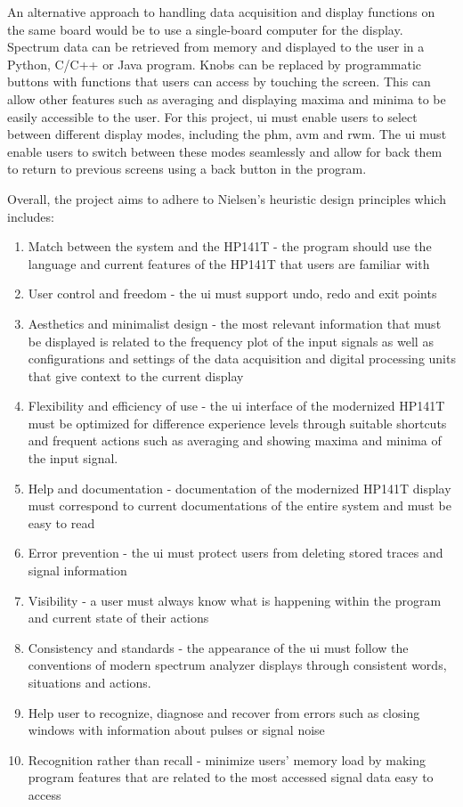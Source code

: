 \documentclass[class=report,11pt,crop=false]{standalone}
\begin{document}
	An alternative approach to handling data acquisition and display functions on the same board would be to use a single-board computer for the display. Spectrum data can be retrieved from memory and displayed to the user in a Python, C/C++ or Java program. Knobs can be replaced by programmatic buttons with functions that users can access by touching the screen. This can allow other features such as averaging and displaying maxima and minima to be easily accessible to the user. For this project, \acrshort{ui} must enable users to select between different display modes, including the \acrshort{phm}, \acrshort{avm} and \acrshort{rwm}. The \acrshort{ui} must enable users to switch between these modes seamlessly and allow for back them to return to previous screens using a back button in the program.
	
	Overall, the project aims to adhere to Nielsen's heuristic design principles which includes:
	\begin{enumerate}
		\item
		Match between the system and the HP141T -  the program should use the language and current features of the HP141T that users are familiar with
		\item 
		User control and freedom - the \acrshort{ui} must support undo, redo and exit points
		\item 
		Aesthetics and minimalist design - the most relevant information that must be displayed is related to the frequency plot of the input signals as well as configurations and settings of the data acquisition and digital processing units that give context to the current display
		\item 
		Flexibility and efficiency of use - the \acrshort{ui} interface of the modernized HP141T must be optimized for difference experience levels through suitable shortcuts and frequent actions such as averaging and showing maxima and minima of the input signal.
		\item 
		Help and documentation - documentation of the modernized HP141T display must correspond to current documentations of the entire system and must be easy to read
		\item 
		Error prevention - the \acrshort{ui} must protect users from deleting stored traces and signal information
		\item 
		Visibility - a user must always know what is happening within the program and current state of their actions
		\item 
		Consistency and standards - the appearance of the \acrshort{ui} must follow the conventions of modern spectrum analyzer displays through consistent words, situations and actions.
		\item 
		Help user to recognize, diagnose and recover from errors such as closing windows with information about pulses or signal noise
		\item 
		Recognition rather than recall - minimize users' memory load by making program features that are related to the most accessed signal data easy to access
	\end{enumerate}
	
\end{document}
